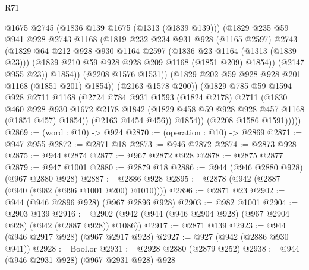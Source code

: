 \begin{lexlean}{R71}
\begin{coremodule}
                      @1675
                      @2745
                      (@1836 @139 @1675 (@1313 (@1839 @139)))
                      (@1829
                        @235
                        @59
                        @941
                        @928
                        @2743
                        @1168
                        (@1819
                          @232
                          @234
                          @931
                          @928
                          (@1165 @2597)
                          @2743
                          (@1829
                            @64
                            @212
                            @928
                            @930
                            @1164
                            @2597
                            (@1836 @23 @1164 (@1313 (@1839 @23)))
                            (@1829 @210 @59 @928 @928 @209 @1168 (@1851 @209) @1854))
                          (@2147 @955 @23))
                        @1854))
                    (@2208 @1576 @1531))
                  (@1829 @202 @59 @928 @928 @201 @1168 (@1851 @201) @1854))
                (@2163 @1578 @200))
              (@1829
                @785
                @59
                @1594
                @928
                @2711
                @1168
                (@2724
                  @784
                  @931
                  @1593
                  (@1824 @2178)
                  @2711
                  (@1830
                    @460
                    @928
                    @930
                    @1672
                    @2178
                    @1842
                    (@1829 @458 @59 @928 @928 @457 @1168 (@1851 @457) @1854))
                  (@2163 @1454 @456))
                @1854))
            (@2208 @1586 @1591)))))
@2869 := (word : @10) -> @924
@2870 := (operation : @10) -> @2869
@2871 := @947 @955
@2872 := @2871 @18
@2873 := @946 @2872
@2874 := @2873 @928
@2875 := @944 @2874
@2877 := @967 @2872 @928
@2878 := @2875 @2877
@2879 := @947 @1001
@2880 := @2879 @18
@2886 := @944 (@946 @2880 @928) (@967 @2880 @928)
@2887 := @2886 @928
@2895 := @2878 (@942 (@2887 (@940 (@982 (@996 @1001 @200) @1010))))
@2896 := @2871 @23
@2902 := @944 (@946 @2896 @928) (@967 @2896 @928)
@2903 := @982 @1001
@2904 := @2903 @139
@2916 := @2902 (@942 (@944 (@946 @2904 @928) (@967 @2904 @928) (@942 (@2887 @928)) @1086))
@2917 := @2871 @139
@2923 := @944 (@946 @2917 @928) (@967 @2917 @928)
@2927 := @927 (@942 (@2886 @930 @941))
@2928 := Bool.or
@2931 := @2928 @2880 (@2879 @252)
@2938 := @944 (@946 @2931 @928) (@967 @2931 @928) @928

\end{coremodule}
\end{lexlean}
